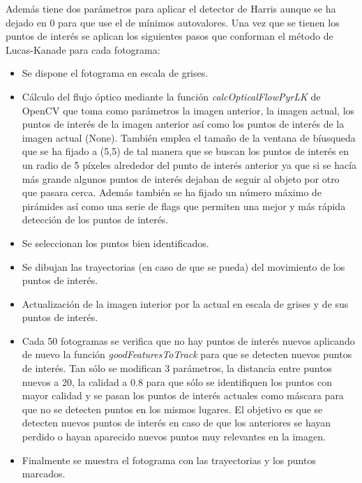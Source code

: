 \documentclass[a4paper,12pt]{article}
\begin{document}
{\vspace{0.5cm}

Además tiene dos parámetros para aplicar el detector de Harris aunque se ha dejado en 0 para que use el de mínimos autovalores. Una vez que se tienen los puntos de interés se aplican los siguientes pasos que conforman el método de Lucas-Kanade para cada fotograma:

\vspace{0.5cm}

\begin{itemize}
  \item Se dispone el fotograma en escala de grises.
  \item Cálculo del flujo óptico mediante la función \textit{calcOpticalFlowPyrLK} de OpenCV que toma como parámetros la imagen anterior, la imagen actual, los puntos de interés de la imagen anterior así como los puntos de interés de la imagen actual (None). También emplea el tamaño de la ventana de bíusqueda que se ha fijado a (5,5)
  de tal manera que se buscan los puntos de interés en un radio de 5 píxeles alrededor del punto de interés anterior ya que si se hacía más grande algunos puntos de interés dejaban de seguir al objeto por otro que pasara cerca. Además también se ha fijado un número máximo de pirámides así como una serie de flags que permiten una mejor y 
  más rápida detección de los puntos de interés.
  \item Se seleccionan los puntos bien identificados.
  \item Se dibujan las trayectorias (en caso de que se pueda) del movimiento de los puntos de interés.
  \item Actualización de la imagen interior por la actual en escala de grises y de sus puntos de interés.
  \item Cada 50 fotogramas se verifica que no hay puntos de interés nuevos aplicando de nuevo la función \textit{goodFeaturesToTrack} para que se detecten nuevos puntos de interés. Tan sólo se modifican 3 parámetros, la distancia entre puntos nuevos a 20, la calidad a 0.8 para que
  sólo se identifiquen los puntos con mayor calidad y se pasan los puntos de interés actuales como máscara para que no se detecten puntos en los mismos lugares. El objetivo es que se detecten nuevos puntos de interés en caso de que los anteriores se hayan perdido o hayan aparecido 
  nuevos puntos muy relevantes en la imagen.
  \item Finalmente se muestra el fotograma con las trayectorias y los puntos marcados.
\end{itemize}

}
\end{document}
